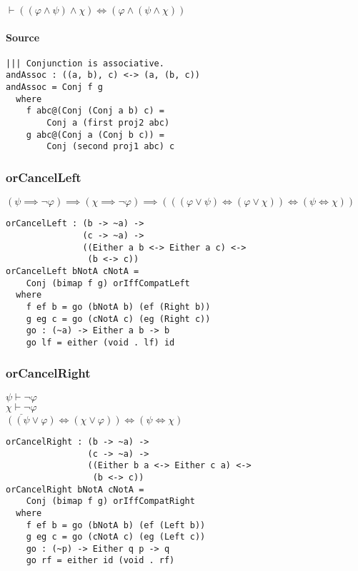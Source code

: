 \documentclass{acm_proc_article-sp}
\begin{document}
\(\vdash ((\varphi \land \psi) \land \chi) \iff (\varphi \land (\psi \land \chi))\)

\paragraph{Source}\label{source-2}

\begin{verbatim}
||| Conjunction is associative.
andAssoc : ((a, b), c) <-> (a, (b, c))
andAssoc = Conj f g
  where
    f abc@(Conj (Conj a b) c) =
        Conj a (first proj2 abc)
    g abc@(Conj a (Conj b c)) =
        Conj (second proj1 abc) c
\end{verbatim}

\subsubsection{orCancelLeft}\label{orcancelleft}

\((\psi \implies \neg \varphi) \implies (\chi \implies \neg \varphi) \implies (((\varphi \lor \psi) \iff (\varphi \lor \chi)) \iff (\psi \iff \chi))\)

\begin{verbatim}
orCancelLeft : (b -> ~a) ->
               (c -> ~a) ->
               ((Either a b <-> Either a c) <->
                (b <-> c))
orCancelLeft bNotA cNotA =
    Conj (bimap f g) orIffCompatLeft
  where
    f ef b = go (bNotA b) (ef (Right b))
    g eg c = go (cNotA c) (eg (Right c))
    go : (~a) -> Either a b -> b
    go lf = either (void . lf) id
\end{verbatim}

\subsubsection{orCancelRight}\label{orcancelright}

\(\psi \vdash \neg \varphi\)\\
\(\underline{\chi \vdash \neg \varphi}\)\\
\(((\psi \lor \varphi) \iff (\chi \lor \varphi)) \iff (\psi \iff \chi)\)

\begin{verbatim}
orCancelRight : (b -> ~a) ->
                (c -> ~a) ->
                ((Either b a <-> Either c a) <->
                 (b <-> c))
orCancelRight bNotA cNotA =
    Conj (bimap f g) orIffCompatRight
  where
    f ef b = go (bNotA b) (ef (Left b))
    g eg c = go (cNotA c) (eg (Left c))
    go : (~p) -> Either q p -> q
    go rf = either id (void . rf)
\end{verbatim}
\end{document}

